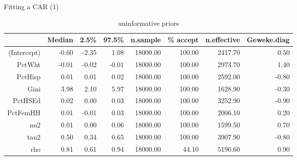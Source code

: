 \documentclass[aspectratio = 169, 12pt]{beamer}\usepackage[]{graphicx}\usepackage[]{color}
\begin{document}
\begin{frame}{Fitting a CAR (1)}
\begin{table}[ht]
\centering
\begin{tabular}{rrrrrrrr}
  \hline
 & Median & 2.5\% & 97.5\% & n.sample & \% accept & n.effective & Geweke.diag \\ 
  \hline
(Intercept) & -0.60 & -2.35 & 1.08 & 18000.00 & 100.00 & 2417.70 & 0.50 \\ 
  PctWht & -0.01 & -0.02 & -0.01 & 18000.00 & 100.00 & 2973.70 & 1.40 \\ 
  PctHisp & 0.01 & 0.01 & 0.02 & 18000.00 & 100.00 & 2592.00 & -0.80 \\ 
  Gini & 3.98 & 2.10 & 5.97 & 18000.00 & 100.00 & 1628.90 & -0.30 \\ 
  PctHSEd & 0.02 & 0.00 & 0.03 & 18000.00 & 100.00 & 3252.90 & -0.90 \\ 
  PctFemHH & 0.01 & -0.01 & 0.03 & 18000.00 & 100.00 & 2006.10 & 0.20 \\ 
  nu2 & 0.01 & 0.00 & 0.06 & 18000.00 & 100.00 & 1599.50 & 0.70 \\ 
  tau2 & 0.50 & 0.34 & 0.65 & 18000.00 & 100.00 & 3907.90 & -0.80 \\ 
  rho & 0.81 & 0.61 & 0.94 & 18000.00 & 44.10 & 5196.60 & 0.90 \\ 
   \hline
\end{tabular}
\caption{uninformative priors} 
\end{table}


\end{frame}
\end{document}
